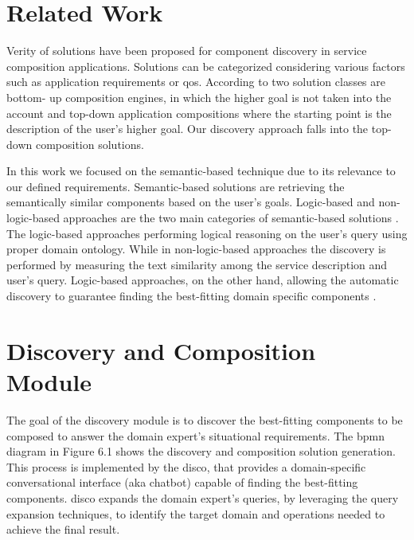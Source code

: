 \vspace{-10pt}
\hypertarget{sec:discovery.related-work}{%
\section{Related Work}\label{sec:dsac-disco.related-work}}
\vspace{10pt}

Verity of solutions have been proposed for component discovery in service composition applications. Solutions can be categorized considering various factors such as application requirements or \gls{qos}. According to \autocite{Tschudnowsky2016} two solution classes are bottom- up composition engines, in which the higher goal is not taken into the account and top-down application compositions where the starting point is the description of the user’s higher goal. Our discovery approach falls into the top-down composition solutions.

In this work we focused on the semantic-based technique due to its relevance to our defined requirements. Semantic-based solutions are retrieving the semantically similar components based on the user’s goals. Logic-based and non-logic-based approaches are the two main categories of semantic-based solutions \autocite{Jalali2014}. The logic-based approaches performing logical reasoning on the user’s query using proper domain ontology. While in non-logic-based approaches the discovery is performed by measuring the text similarity among the service description and user’s query. Logic-based approaches, on the other hand, allowing the automatic discovery  to guarantee finding the best-fitting domain specific components \autocite{Zhang2018}. 


\vspace{-10pt}
\hypertarget{sec:discovery-module}{%
\section{Discovery and Composition Module}\label{sec:discovery-module}}
\vspace{10pt}

The goal of the discovery module is to discover the best-fitting components to be composed to answer the domain expert’s situational requirements. The \gls{bpmn} diagram in Figure 6.1 shows the discovery and composition solution generation. This process is implemented by the \gls{disco}, that provides a domain-specific conversational interface (aka chatbot) capable of finding the best-fitting components. \gls{disco} expands the domain expert’s queries, by leveraging the query expansion techniques, to identify the target domain and operations needed to achieve the final result.

